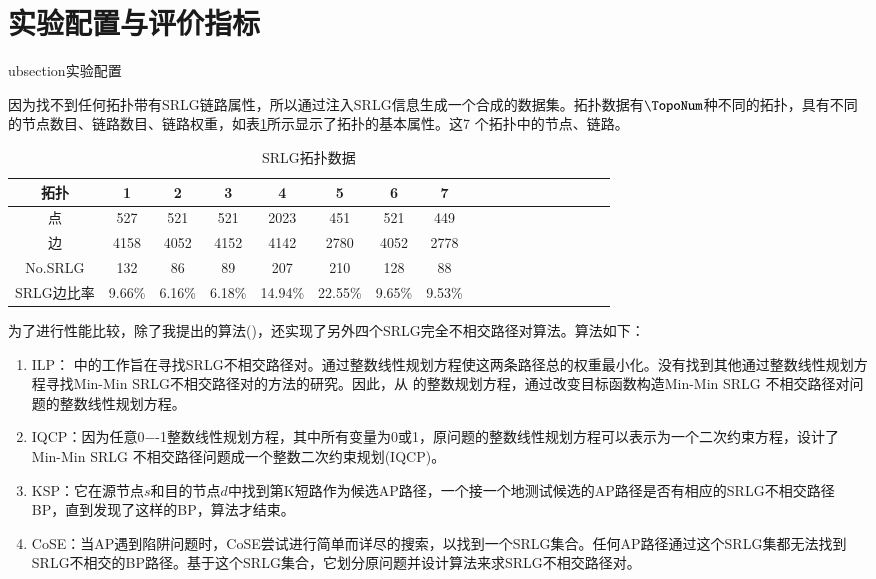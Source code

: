 \section{实验配置与评价指标}
ubsection{实验配置}

因为找不到任何拓扑带有SRLG链路属性，所以通过注入SRLG信息生成一个合成的数据集。拓扑数据有$\TopoNum$种不同的拓扑，具有不同的节点数目、链路数目、链路权重，如表\ref{tab:AllSample}所示显示了拓扑的基本属性。这7 个拓扑中的节点、链路。

\begin{table}[htbp]
\caption{SRLG拓扑数据}
  \centering
\footnotesize{  \begin{tabular}{*{18}{c}}
\toprule
拓扑 & 1 & 2 & 3 & 4 & 5 & 6& 7   \\
\midrule
点   &     527&      521    &      521     &    2023             &     451     &     521     &     449       \\
边   &    4158 &  4052     &    4152      &   4142          &       2780   &      4052   &      2778    \\
No.SRLG & 132 &  86   &  89  &  207        & 210  &  128  &   88    \\
SRLG边比率 & 9.66\% & 6.16\% &   6.18\% &   14.94\%    &   22.55\%  &  9.65\% &   9.53\%     \\
\bottomrule
\end{tabular}
}
\label{tab:AllSample}
\end{table}

为了进行性能比较，除了我提出的算法(\CI)，还实现了另外四个SRLG完全不相交路径对算法。算法如下：
\begin{enumerate}
  \item ILP\cite{hu2003diverse}： 中的工作旨在寻找SRLG不相交路径对。通过整数线性规划方程使这两条路径总的权重最小化。没有找到其他通过整数线性规划方程寻找Min-Min SRLG不相交路径对的方法的研究。因此，从\cite{hu2003diverse} 的整数规划方程，通过改变目标函数构造Min-Min SRLG 不相交路径对问题的整数线性规划方程。
  \item IQCP\cite{hu2003diverse}：因为任意0−-1整数线性规划方程，其中所有变量为0或1，原问题的整数线性规划方程可以表示为一个二次约束方程，设计了Min-Min SRLG 不相交路径问题成一个整数二次约束规划(IQCP)\cite{hu2003diverse}。
  \item KSP\cite{eppstein1998finding}：它在源节点$s$和目的节点$d$中找到第K短路作为候选AP路径，一个接一个地测试候选的AP路径是否有相应的SRLG不相交路径BP，直到发现了这样的BP，算法才结束。
  \item CoSE\cite{rostami2007cose}：当AP遇到陷阱问题时，CoSE尝试进行简单而详尽的搜索，以找到一个SRLG集合。任何AP路径通过这个SRLG集都无法找到SRLG不相交的BP路径。基于这个SRLG集合，它划分原问题并设计算法来求SRLG不相交路径对。
\end{enumerate}

